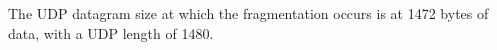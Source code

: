 The UDP datagram size at which the fragmentation occurs is at 1472 bytes of data, with a UDP length of 1480.